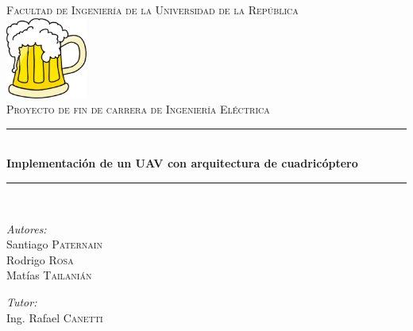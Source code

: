 \documentclass[main]{subfiles}
\newcommand{\HRule}{\rule{\linewidth}{0.5mm}}
\begin{document}
\begin{titlepage}

\begin{center}


  

\textsc{\LARGE Facultad de Ingenier\'ia de la Universidad de la Rep\'ublica}\\[1.5cm]
\includegraphics[width=0.20\textwidth]{./pics_portada/logo.pdf}\\[1cm]  
\textsc{\Large Proyecto de fin de carrera de Ingenier\'ia El\'ectrica}\\[0.5cm]


\HRule \\[0.4cm]
{ \huge \bfseries Implementaci\'on de un UAV con arquitectura de cuadric\'optero}\\[0.4cm]

\HRule \\[1.5cm]

\begin{minipage}{0.4\textwidth}
\begin{flushleft} \large
\emph{Autores:}\\
Santiago \textsc{Paternain}\\
Rodrigo \textsc{Rosa}\\
Mat\'ias \textsc{Tailani\'an}
\end{flushleft}
\end{minipage}
\begin{minipage}{0.4\textwidth}
\begin{flushright} \large
\emph{Tutor:} \\
Ing. Rafael \textsc{Canetti}
\end{flushright}
\end{minipage}



\end{center}
\end{titlepage}
\end{document}
